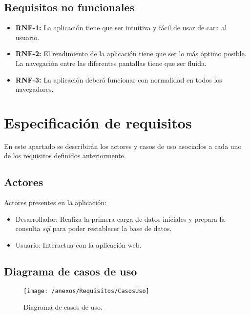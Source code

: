 \subsection{Requisitos no funcionales}

	\begin{itemize}
	
		\item \textbf{RNF-1:} La aplicación tiene que ser intuitiva y fácil de usar de cara al usuario.
		\item \textbf{RNF-2:} El rendimiento de la aplicación tiene que ser lo más óptimo posible. La navegación entre las diferentes pantallas tiene que ser fluida. 
		\item \textbf{RNF-3:} La aplicación deberá funcionar con normalidad en todos los navegadores.
		
	\end{itemize}
	
\newpage

\section{Especificación de requisitos}

En este apartado se describirán los actores y casos de uso asociados a cada uno de los requisitos definidos anteriormente. 

\subsection{Actores}

Actores presentes en la aplicación:

\begin{itemize}
	\item Desarrollador: Realiza la primera carga de datos iniciales y prepara la consulta \textit{sql} para poder restablecer la base de datos.
	\item Usuario: Interactua con la aplicación web.
\end{itemize}

\subsection{Diagrama de casos de uso}

\begin{figure}[h]
	\centering
	\texttt{[image: /anexos/Requisitos/CasosUso]}
	\caption{Diagrama de casos de uso.}
	\label{fig:casosUso}
\end{figure}

